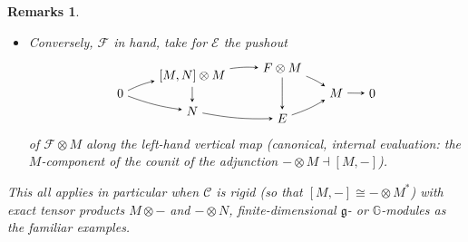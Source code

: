 \documentclass[11pt,leqno]{article}
\theoremstyle{plain}
\theoremstyle{plain}
\theoremstyle{plain}
\newtheorem{remarks}[lemma]{Remarks}
\numberwithin{equation}{section}
\theoremstyle{nonumberplain}
\newcommand\bG{{\mathbb G}}
\newcommand\cC{{\mathcal C}}
\newcommand\cE{{\mathcal E}}
\newcommand\cF{{\mathcal F}}
\newcommand\fg{{\mathfrak g}}
\newcommand\1{{\bf 1}}
\begin{document}
\begin{remarks}
\begin{enumerate}[(1),wide]
\begin{itemize}[wide]
    \item Conversely, $\cF$ in hand, take for $\cE$ the pushout
      \begin{equation*}
        \begin{tikzpicture}[>=stealth,auto,baseline=(current  bounding  box.center)]
          \path[anchor=base] 
          (0,0) node (0l) {$0$}
          +(2,.5) node (ul) {$[M,N]\otimes M$}
          +(4.5,.7) node (um) {$F\otimes M$}
          +(6,0) node (r) {$M$}
          +(2,-.5) node (dl) {$N$}
          +(4.5,-.7) node (dm) {$E$}
          +(7,0) node (0r) {$0$}
          ;
          \draw[->] (0l) to[bend left=6] node[pos=.5,auto] {$\scriptstyle $} (ul);
          \draw[->] (0l) to[bend right=6] node[pos=.5,auto] {$\scriptstyle $} (dl);
          \draw[->] (r) to[bend right=0] node[pos=.5,auto] {$\scriptstyle $} (0r);
          \draw[->] (um) to[bend left=6] node[pos=.5,auto] {$\scriptstyle $} (r);
          \draw[->] (dm) to[bend right=6] node[pos=.5,auto] {$\scriptstyle $} (r);
          \draw[->] (ul) to[bend left=0] node[pos=.5,auto] {$\scriptstyle $} (dl);
          \draw[->] (um) to[bend left=0] node[pos=.5,auto] {$\scriptstyle $} (dm);
          \draw[->] (ul) to[bend left=6] node[pos=.5,auto] {$\scriptstyle $} (um);
          \draw[->] (dl) to[bend right=6] node[pos=.5,auto] {$\scriptstyle $} (dm);
        \end{tikzpicture}
      \end{equation*}
      of $\cF\otimes M$ along the left-hand vertical map (canonical, internal evaluation: the $M$-component of the counit of the adjunction $-\otimes M\dashv [M,-]$).
    \end{itemize}
    
    This all applies in particular when $\cC$ is \emph{rigid} \cite[Definition 2.10.11]{egno} (so that $[M,-]\cong -\otimes M^*$) with exact tensor products $M\otimes-$ and $-\otimes N$, finite-dimensional $\fg$- or $\bG$-modules as the familiar examples.


\end{enumerate}
\end{remarks}
\end{document}
